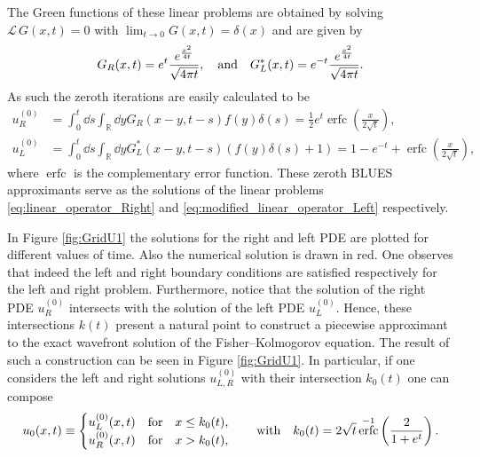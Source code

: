 \documentclass[amsmath,amssymb,amsfonts,aps,pre,preprint,superscriptaddress,bibnotes,showpacs,showkeys,longbibliography]{revtex4-1}
\newcommand*{\lop}{\mathcal{L}\,}
\DeclareMathOperator{\erfc}{erfc}
\begin{document}
The Green functions of these linear problems are obtained by solving 
$\lop G(x,t)=0$ with $\lim_{t\to 0}G(x,t)=\delta(x)$
and are given by
\begin{align}
    G_R(x,t) = e^{t}\frac{e^{\frac{x^2}{4 t}}}{\sqrt{4 \pi t}}, \qq{and}
    G^*_L(x,t) = e^{-t}\frac{e^{\frac{x^2}{4 t}}}{\sqrt{4 \pi t}}.
\end{align}
As such the zeroth iterations are easily calculated to be 
\begin{align}\label{eq:BLUES_zero_iteration_Right}
       u^{(0)}_R &= \int_{0}^{t} \dd{s}\int_{\mathbb{R}} \dd{y} G_R(x-y,t-s) f(y)\delta(s) 
       = \frac{1}{2} e^t \erfc\left(\frac{x}{2 \sqrt{t}}\right),\\
       u^{(0)}_L &= \int_{0}^{t} \dd{s}\int_{\mathbb{R}} \dd{y} G^*_L(x-y,t-s) (f(y)\delta(s)+1) 
       =  1- e^{-t} +\erfc\left(\frac{x}{2 \sqrt{t}}\right),
       \label{eq:BLUES_zero_iteration_Left}
    \end{align}
where $\erfc$ is the complementary error function. These zeroth BLUES approximants serve as the solutions of the linear problems \eqref{eq:linear_operator_Right} and \eqref{eq:modified_linear_operator_Left} respectively. 

In Figure \ref{fig:GridU1} the solutions for the right and left PDE are plotted for different values of time. Also the numerical solution is drawn in red. One observes that indeed the left and right boundary conditions are satisfied respectively for the left and right problem. Furthermore, notice that the solution of the right PDE $u^{(0)}_R$ intersects with the solution of the left PDE $u^{(0)}_L$. Hence, these intersections $k(t)$ present a natural point to construct a piecewise approximant to the exact wavefront solution of the Fisher–Kolmogorov equation. The result of such a construction can be seen in Figure \ref{fig:GridU1}. In particular, if one considers the left and right solutions $u^{(0)}_{L,R}$ with their intersection $k_0(t)$ one can compose
\begin{align}
    u_0(x,t)\equiv
    \begin{cases}
    u^{(0)}_{L}(x,t) \qq{for} x\leq k_0(t),\\
    u^{(0)}_{R}(x,t) \qq{for} x>k_0(t),
    \end{cases}
    \qq{with} k_0(t) = 2\sqrt{t}\erfc^{-1}\left(\frac{2}{1+e^{t}}\right).
\end{align}
\end{document}
